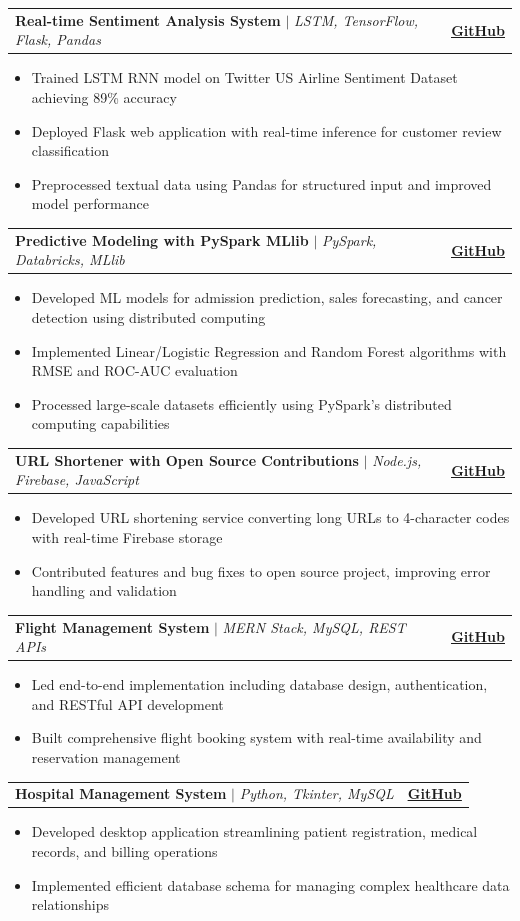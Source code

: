 \documentclass[letterpaper,11pt]{article}
\makeatletter
\newcommand{\resumeItem}[1]{
  \item\small{
    {#1 \vspace{-2pt}}
  }
}
\newcommand{\resumeProjectHeading}[2]{
    \item
    \begin{tabular*}{1.0\textwidth}{l@{\extracolsep{\fill}}r}
      \small#1 & \textbf{\small #2}\\
    \end{tabular*}\vspace{-7pt}
}
\newcommand{\resumeItemListStart}{\begin{itemize}}
\newcommand{\resumeItemListEnd}{\end{itemize}\vspace{-5pt}}
\makeatother
\begin{document}
\resumeProjectHeading
{\textbf{Real-time Sentiment Analysis System} $|$ \emph{LSTM, TensorFlow, Flask, Pandas}}{\href{https://github.com/Nehal04052/Customer-Feedback-Sentiment-Analysis-using-LSTM}{\underline{GitHub}}}
\resumeItemListStart
\resumeItem{Trained LSTM RNN model on Twitter US Airline Sentiment Dataset achieving 89\% accuracy}
\resumeItem{Deployed Flask web application with real-time inference for customer review classification}
\resumeItem{Preprocessed textual data using Pandas for structured input and improved model performance}
\resumeItemListEnd

\resumeProjectHeading
{\textbf{Predictive Modeling with PySpark MLlib} $|$ \emph{PySpark, Databricks, MLlib}}{\href{https://github.com/Nehal04052/Big-Data-and-Cloud-Computing}{\underline{GitHub}}}
\resumeItemListStart
\resumeItem{Developed ML models for admission prediction, sales forecasting, and cancer detection using distributed computing}
\resumeItem{Implemented Linear/Logistic Regression and Random Forest algorithms with RMSE and ROC-AUC evaluation}
\resumeItem{Processed large-scale datasets efficiently using PySpark's distributed computing capabilities}
\resumeItemListEnd

\newpage

\resumeProjectHeading
{\textbf{URL Shortener with Open Source Contributions} $|$ \emph{Node.js, Firebase, JavaScript}}{\href{https://github.com/Nehal04052/URL-Shortener}{\underline{GitHub}}}
\resumeItemListStart
\resumeItem{Developed URL shortening service converting long URLs to 4-character codes with real-time Firebase storage}
\resumeItem{Contributed features and bug fixes to open source project, improving error handling and validation}
\resumeItemListEnd

\resumeProjectHeading
{\textbf{Flight Management System} $|$ \emph{MERN Stack, MySQL, REST APIs}}{\href{https://github.com/Nehal04052/airline-reservation-system}{\underline{GitHub}}}
\resumeItemListStart
\resumeItem{Led end-to-end implementation including database design, authentication, and RESTful API development}
\resumeItem{Built comprehensive flight booking system with real-time availability and reservation management}
\resumeItemListEnd

\resumeProjectHeading
{\textbf{Hospital Management System} $|$ \emph{Python, Tkinter, MySQL}}{\href{https://github.com/Nehal04052/Hospital_Management_System}{\underline{GitHub}}}
\resumeItemListStart
\resumeItem{Developed desktop application streamlining patient registration, medical records, and billing operations}
\resumeItem{Implemented efficient database schema for managing complex healthcare data relationships}
\resumeItemListEnd
\end{document}
